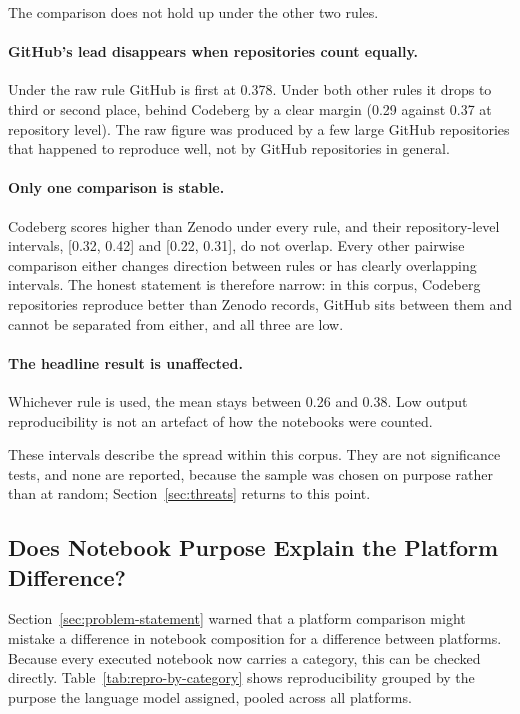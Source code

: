 The comparison does not hold up under the other two rules.

\paragraph{GitHub's lead disappears when repositories count equally.} Under the raw rule GitHub is first at 0.378. Under both other rules it drops to third or second place, behind Codeberg by a clear margin (0.29 against 0.37 at repository level). The raw figure was produced by a few large GitHub repositories that happened to reproduce well, not by GitHub repositories in general.

\paragraph{Only one comparison is stable.} Codeberg scores higher than Zenodo under every rule, and their repository-level intervals, [0.32, 0.42] and [0.22, 0.31], do not overlap. Every other pairwise comparison either changes direction between rules or has clearly overlapping intervals. The honest statement is therefore narrow: in this corpus, Codeberg repositories reproduce better than Zenodo records, GitHub sits between them and cannot be separated from either, and all three are low.

\paragraph{The headline result is unaffected.} Whichever rule is used, the mean stays between 0.26 and 0.38. Low output reproducibility is not an artefact of how the notebooks were counted.

These intervals describe the spread within this corpus. They are not significance tests, and none are reported, because the sample was chosen on purpose rather than at random; Section~\ref{sec:threats} returns to this point.

\subsection{Does Notebook Purpose Explain the Platform Difference?}
\label{sec:eval-category-effect}

Section~\ref{sec:problem-statement} warned that a platform comparison might mistake a difference in notebook composition for a difference between platforms. Because every executed notebook now carries a category, this can be checked directly. Table~\ref{tab:repro-by-category} shows reproducibility grouped by the purpose the language model assigned, pooled across all platforms.

